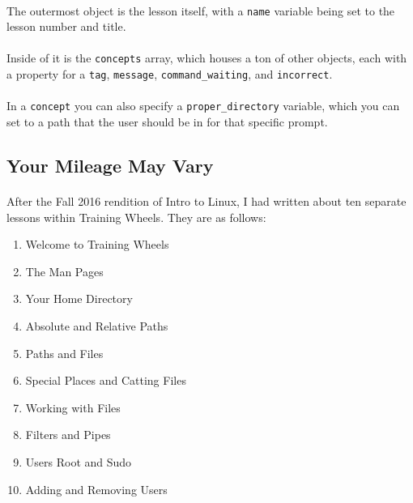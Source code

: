 \documentclass[11pt]{article}
\begin{document}
	\paragraph{} The outermost object is the lesson itself, with a \texttt{name} variable being set to the lesson number and title.

	\paragraph{} Inside of it is the \texttt{concepts} array, which houses a ton of other objects, each with a property for a \texttt{tag}, \texttt{message}, \texttt{command\_waiting}, and \texttt{incorrect}.

	\paragraph{} In a \texttt{concept} you can also specify a \texttt{proper\_directory} variable, which you can set to a path that the user should be in for that specific prompt.

	\newpage

	\subsection{Your Mileage May Vary}

	\paragraph{} After the Fall 2016 rendition of Intro to Linux, I had written about ten separate lessons within Training Wheels. They are as follows:

	\begin{enumerate}
		\item Welcome to Training Wheels
		\item The Man Pages
		\item Your Home Directory
		\item Absolute and Relative Paths
		\item Paths and Files
		\item Special Places and Catting Files
		\item Working with Files
		\item Filters and Pipes
		\item Users Root and Sudo
		\item Adding and Removing Users
	\end{enumerate}
\end{document}
